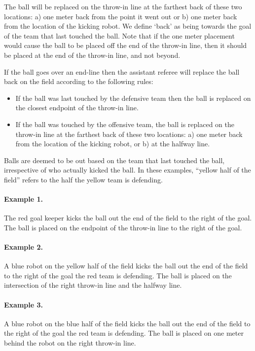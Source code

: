 \documentclass[12pt]{article}
\begin{document}
The ball will be replaced on the throw-in line at the farthest back of these two locations: a) one meter back from the point it went out or b) one meter back from the location of the kicking robot. We define `back' as being towards the goal of the team that last touched the ball. Note that if the one meter placement would cause the ball to be placed off the end of the throw-in line, then it should be placed at the end of the throw-in line, and not beyond.

If the ball goes over an end-line then the assistant referee will replace the ball back on the field according to the following rules:

\begin{itemize}

\item If the ball was last touched by the defensive team then the ball is replaced on the closest endpoint of the throw-in line.

\item If the ball was touched by the offensive team, the ball is replaced on
the throw-in line at the farthest back of these two locations: a) one
meter back from the location of the kicking robot, or b) at the halfway
line.

\end{itemize}

Balls are deemed to be out based on the team that last touched the ball, irrespective of who actually kicked the ball.  In these examples, ``yellow half of the field'' refers to the half the yellow team is defending.

\paragraph{Example 1.} The red goal keeper kicks the ball out the end of the field to the right of the goal. The ball is placed on the endpoint of the throw-in line to the right of the goal.

\paragraph{Example 2.} A blue robot on the yellow half of the field kicks the ball out the end of the field to the right of the goal the red team is defending. The ball is placed on the intersection of the right throw-in line and the halfway line.

\paragraph{Example 3.} A blue robot on the blue half of the field kicks the ball out the end of the field to the right of the goal the red team is defending. The ball is placed on one meter behind the robot on the right throw-in line.
\end{document}
